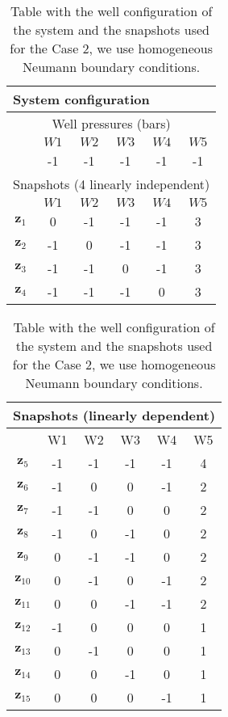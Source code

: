 \documentclass[12pt]{article}
\numberwithin{equation}{section}
\begin{document}
\begin{table}[!ht]\centering
\begin{minipage}{.45\textwidth}
\vspace{-10pt}
\centering
\begin{tabular}{ |c|c|c|c|c|c|} 
 \hline
  \multicolumn{6}{|l|}{System configuration} \\ 
  \hline
  \multicolumn{6}{|c|}{Well pressures (bars)}\\
  \hline
  &$W1$ &$W2$ &$W3$ &$W4$ &$W5$ \\
  \hline
&-1 & -1& -1& -1& -1\\
\hline
\multicolumn{6}{|l|}{Snapshots (4 linearly independent)} \\
\hline
 &$W1$ &$W2$ &$W3$ &$W4$ &$W5$ \\
  \hline

$\mathbf{z}_1$& 0&-1 &-1 &-1 &3 \\
$\mathbf{z}_2$& -1&0 &-1 &-1 &3  \\
$\mathbf{z}_3$& -1&-1 &0 &-1 &3  \\
$\mathbf{z}_4$& -1&-1 &-1 &0 &3  \\
 \hline
 \end{tabular}
\label{table:case2}\end{minipage}%
\hspace{10pt}
 \begin{minipage}{.45\textwidth}
 \begin{tabular}{ |c|c|c|c|c|c|} 
 \hline
 \multicolumn{6}{|l|}{Snapshots (linearly dependent)} \\
\hline
 &W1 &W2 &W3 &W4 &W5 \\
  \hline
$\mathbf{z}_5$& -1&-1 &-1 &-1 &4  \\
$\mathbf{z}_6$& -1&0 &0 &-1 &2  \\
$\mathbf{z}_7$& -1&-1 &0 &0 &2  \\
$\mathbf{z}_8$& -1&0 &-1 &0 &2  \\
$\mathbf{z}_9$& 0&-1 &-1 &0 &2  \\
$\mathbf{z}_{10}$& 0&-1 &0 &-1 &2  \\
$\mathbf{z}_{11}$& 0&0 &-1 &-1 &2  \\
$\mathbf{z}_{12}$& -1&0 &0 &0 &1  \\
$\mathbf{z}_{13}$& 0&-1 &0 &0 &1  \\
$\mathbf{z}_{14}$& 0&0 &-1 &0 &1  \\
$\mathbf{z}_{15}$& 0&0 &0 &-1 &1  \\
 \hline
 \end{tabular}

\label{table:case2}\end{minipage}\caption{Table with the well configuration of the system and the snapshots used for the Case 2, we use homogeneous Neumann boundary conditions.}
\vspace{-10pt}
\end{table}
\end{document}
